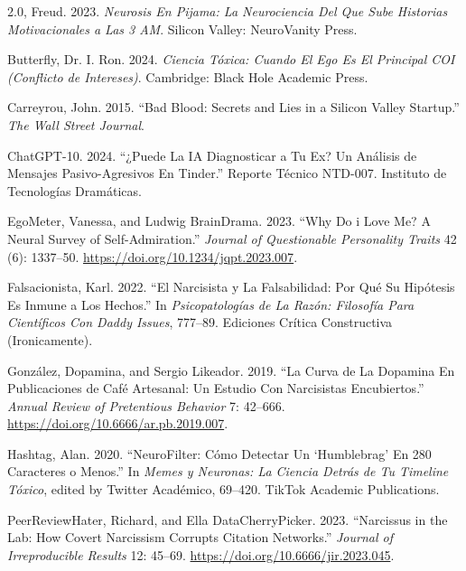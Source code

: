 \documentclass[
]{article}
\newlength{\cslhangindent}
\newenvironment{CSLReferences}[2] %
 {\begin{list}{}{%
  \setlength{\itemindent}{0pt}
  \setlength{\leftmargin}{0pt}
  \setlength{\parsep}{0pt}
  \ifodd #1
   \setlength{\leftmargin}{\cslhangindent}
   \setlength{\itemindent}{-1\cslhangindent}
  \fi
  \setlength{\itemsep}{#2\baselineskip}}}
 {\end{list}}
\begin{document}
\label{refs}
\begin{CSLReferences}{1}{0}
2.0, Freud. 2023. \emph{Neurosis En Pijama: La Neurociencia Del Que Sube
Historias Motivacionales a Las 3 AM}. Silicon Valley: NeuroVanity Press.

Butterfly, Dr. I. Ron. 2024. \emph{Ciencia Tóxica: Cuando El Ego Es El
Principal {COI} (Conflicto de Intereses)}. Cambridge: Black Hole
Academic Press.

Carreyrou, John. 2015. {``Bad Blood: Secrets and Lies in a Silicon
Valley Startup.''} \emph{The Wall Street Journal}.

ChatGPT-10. 2024. {``¿Puede La {IA} Diagnosticar a Tu Ex? Un Análisis de
Mensajes Pasivo-Agresivos En Tinder.''} Reporte Técnico NTD-007.
Instituto de Tecnologías Dramáticas.

EgoMeter, Vanessa, and Ludwig BrainDrama. 2023. {``Why Do i Love Me? A
Neural Survey of Self-Admiration.''} \emph{Journal of Questionable
Personality Traits} 42 (6): 1337--50.
\url{https://doi.org/10.1234/jqpt.2023.007}.

Falsacionista, Karl. 2022. {``El Narcisista y La Falsabilidad: Por Qué
Su Hipótesis Es Inmune a Los Hechos.''} In \emph{Psicopatologías de La
Razón: Filosofía Para Científicos Con Daddy Issues}, 777--89. Ediciones
Crítica Constructiva (Ironicamente).

González, Dopamina, and Sergio Likeador. 2019. {``La Curva de La
Dopamina En Publicaciones de Café Artesanal: Un Estudio Con Narcisistas
Encubiertos.''} \emph{Annual Review of Pretentious Behavior} 7: 42--666.
\url{https://doi.org/10.6666/ar.pb.2019.007}.

Hashtag, Alan. 2020. {``NeuroFilter: Cómo Detectar Un {{`Humblebrag'}}
En 280 Caracteres o Menos.''} In \emph{Memes y Neuronas: La Ciencia
Detrás de Tu Timeline Tóxico}, edited by Twitter Académico, 69--420.
TikTok Academic Publications.

PeerReviewHater, Richard, and Ella DataCherryPicker. 2023. {``Narcissus
in the Lab: How Covert Narcissism Corrupts Citation Networks.''}
\emph{Journal of Irreproducible Results} 12: 45--69.
\url{https://doi.org/10.6666/jir.2023.045}.


\end{CSLReferences}
\end{document}
